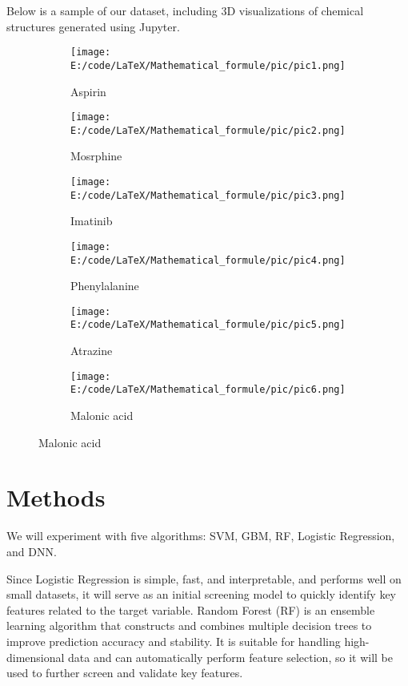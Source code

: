 \documentclass{ctexart}
\begin{document}
Below is a sample of our dataset, including 3D visualizations of chemical structures generated using Jupyter.
\begin{figure}[h]
    \centering
    \begin{subfigure}[b]{0.3\textwidth}
        \centering
        \texttt{[image: E:/code/LaTeX/Mathematical\_formule/pic/pic1.png]}
        \caption{Aspirin}
    \end{subfigure}
    \begin{subfigure}[b]{0.3\textwidth}
        \centering
        \texttt{[image: E:/code/LaTeX/Mathematical\_formule/pic/pic2.png]}       
        \caption{Mosrphine}
    \end{subfigure}
    \begin{subfigure}[b]{0.3\textwidth}
        \centering
        \texttt{[image: E:/code/LaTeX/Mathematical\_formule/pic/pic3.png]}      
        \caption{Imatinib}
    \end{subfigure}
    
    \begin{subfigure}[b]{0.3\textwidth}
        \centering
        \texttt{[image: E:/code/LaTeX/Mathematical\_formule/pic/pic4.png]}       
        \caption{Phenylalanine}
    \end{subfigure}
    \begin{subfigure}[b]{0.3\textwidth}
        \centering
        \texttt{[image: E:/code/LaTeX/Mathematical\_formule/pic/pic5.png]}        
        \caption{Atrazine}      
    \end{subfigure}
    \begin{subfigure}[b]{0.3\textwidth}
        \centering
        \texttt{[image: E:/code/LaTeX/Mathematical\_formule/pic/pic6.png]}
        \caption{Malonic acid}        
    \end{subfigure}

\end{figure}

\section{Methods}

We will experiment with five algorithms: SVM, GBM, RF, Logistic Regression, and DNN.

Since Logistic Regression is simple, fast, and interpretable, and performs well on small datasets, it will serve as an initial screening model to quickly identify key features related to the target variable. Random Forest (RF) is an ensemble learning algorithm that constructs and combines multiple decision trees to improve prediction accuracy and stability. It is suitable for handling high-dimensional data and can automatically perform feature selection, so it will be used to further screen and validate key features.
\end{document}
